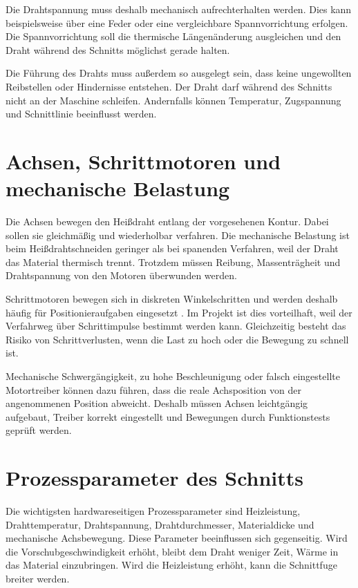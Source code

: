 Die Drahtspannung muss deshalb mechanisch aufrechterhalten werden. Dies kann beispielsweise über eine Feder oder eine vergleichbare Spannvorrichtung erfolgen. Die Spannvorrichtung soll die thermische Längenänderung ausgleichen und den Draht während des Schnitts möglichst gerade halten.

Die Führung des Drahts muss außerdem so ausgelegt sein, dass keine ungewollten Reibstellen oder Hindernisse entstehen. Der Draht darf während des Schnitts nicht an der Maschine schleifen. Andernfalls können Temperatur, Zugspannung und Schnittlinie beeinflusst werden.

\section{Achsen, Schrittmotoren und mechanische Belastung}
\label{sec:hardware_achsen_schrittmotoren}

Die Achsen bewegen den Heißdraht entlang der vorgesehenen Kontur. Dabei sollen sie gleichmäßig und wiederholbar verfahren. Die mechanische Belastung ist beim Heißdrahtschneiden geringer als bei spanenden Verfahren, weil der Draht das Material thermisch trennt. Trotzdem müssen Reibung, Massenträgheit und Drahtspannung von den Motoren überwunden werden.

Schrittmotoren bewegen sich in diskreten Winkelschritten und werden deshalb häufig für Positionieraufgaben eingesetzt \cite{Schroeder:2017}. Im Projekt ist dies vorteilhaft, weil der Verfahrweg über Schrittimpulse bestimmt werden kann. Gleichzeitig besteht das Risiko von Schrittverlusten, wenn die Last zu hoch oder die Bewegung zu schnell ist.

Mechanische Schwergängigkeit, zu hohe Beschleunigung oder falsch eingestellte Motortreiber können dazu führen, dass die reale Achsposition von der angenommenen Position abweicht. Deshalb müssen Achsen leichtgängig aufgebaut, Treiber korrekt eingestellt und Bewegungen durch Funktionstests geprüft werden.

\section{Prozessparameter des Schnitts}
\label{sec:hardware_prozessparameter}

Die wichtigsten hardwareseitigen Prozessparameter sind Heizleistung, Drahttemperatur, Drahtspannung, Drahtdurchmesser, Materialdicke und mechanische Achsbewegung. Diese Parameter beeinflussen sich gegenseitig. Wird die Vorschubgeschwindigkeit erhöht, bleibt dem Draht weniger Zeit, Wärme in das Material einzubringen. Wird die Heizleistung erhöht, kann die Schnittfuge breiter werden.

